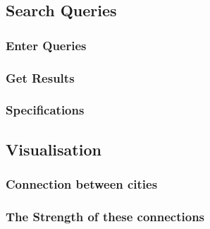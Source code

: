 \subsection{Search Queries}

\subsubsection{Enter Queries}
\subsubsection{Get Results}
\subsubsection{Specifications}

\subsection{Visualisation}

\subsubsection{Connection between cities}
\subsubsection{The Strength of these connections}